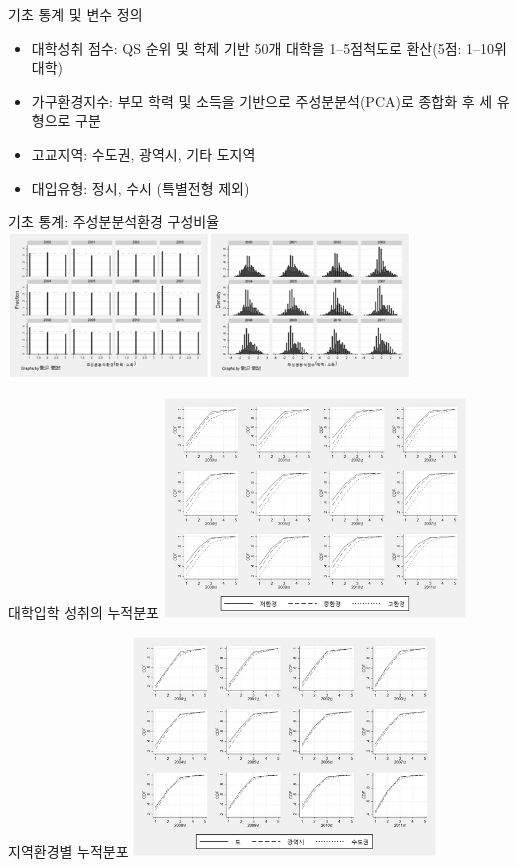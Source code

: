 \documentclass[aspectratio=169,xcolor=dvipsnames,handout]{beamer}
\begin{document}
\begin{frame}{기초 통계 및 변수 정의}
  \begin{itemize}
    \item 대학성취 점수: QS 순위 및 학제 기반 50개 대학을 1--5점척도로 환산(5점: 1--10위 대학)
    \item 가구환경지수: 부모 학력 및 소득을 기반으로 주성분분석(PCA)로 종합화 후 세 유형으로 구분
    \item 고교지역: 수도권, 광역시, 기타 도지역
    \item 대입유형: 정시, 수시 (특별전형 제외)
  \end{itemize}
\end{frame}

\begin{frame}{기초 통계: 주성분분석환경 구성비율}
    \centering
    \includegraphics[width=0.8\textwidth]{figure/goms_pca.png}
\end{frame}

\begin{frame}{대학입학 성취의 누적분포}
  \centering
  \includegraphics[width=0.6\textwidth]{figure/goms_cdf_bypca.png}
\end{frame}

\begin{frame}{지역환경별 누적분포}
  \centering
  \includegraphics[width=0.6\textwidth]{figure/goms_cdf_byrgn.png}
\end{frame}
\end{document}
